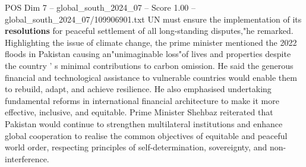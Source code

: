\begin{textsample}{POS Dim 7 – global\_south\_2024\_07 – Score 1.00 – global\_south\_2024\_07/109906901.txt}
UN must ensure the implementation of its \textbf{resolutions} for peaceful settlement of all long-standing disputes,"he remarked.
Highlighting the issue of climate change, the prime minister mentioned the 2022 floods in Pakistan causing an"unimaginable loss"of lives and properties despite the country ' s minimal contributions to carbon omission.
He said the generous financial and technological assistance to vulnerable countries would enable them to rebuild, adapt, and achieve resilience.
He also emphasised undertaking fundamental reforms in international financial architecture to make it more effective, inclusive, and equitable.
Prime Minister Shehbaz reiterated that Pakistan would continue to strengthen multilateral institutions and enhance global cooperation to realise the common objectives of equitable and peaceful world order, respecting principles of self-determination, sovereignty, and non-interference.

\end{textsample}
